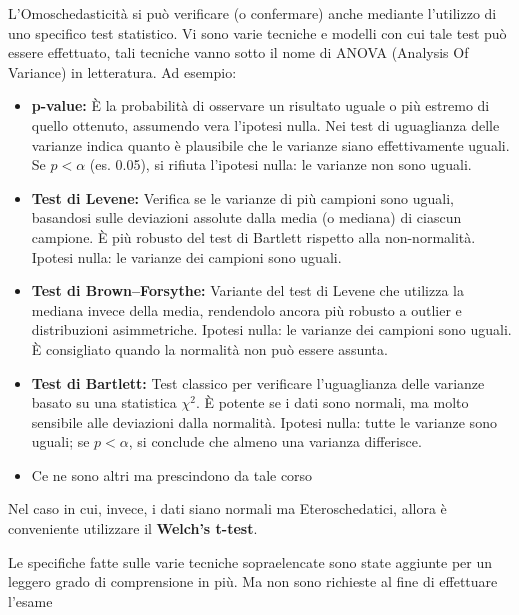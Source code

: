 L'Omoschedasticità si può verificare (o confermare) anche mediante l'utilizzo di uno specifico test statistico. Vi sono varie tecniche e modelli con cui tale test può essere effettuato, tali tecniche vanno sotto il nome di ANOVA (Analysis Of Variance) in letteratura. Ad esempio: 
\begin{itemize}

  \item \textbf{p-value:} 
  È la probabilità di osservare un risultato uguale o più estremo di quello ottenuto, assumendo vera l’ipotesi nulla. 
  Nei test di uguaglianza delle varianze indica quanto è plausibile che le varianze siano effettivamente uguali. 
  Se $p < \alpha$ (es. 0.05), si rifiuta l’ipotesi nulla: le varianze non sono uguali.

  \item \textbf{Test di Levene:} 
  Verifica se le varianze di più campioni sono uguali, basandosi sulle deviazioni assolute dalla media (o mediana) di ciascun campione. 
  È più robusto del test di Bartlett rispetto alla non-normalità. 
  Ipotesi nulla: le varianze dei campioni sono uguali.

  \item \textbf{Test di Brown–Forsythe:} 
  Variante del test di Levene che utilizza la mediana invece della media, rendendolo ancora più robusto a outlier e distribuzioni asimmetriche. 
  Ipotesi nulla: le varianze dei campioni sono uguali. 
  È consigliato quando la normalità non può essere assunta.

  \item \textbf{Test di Bartlett:} 
  Test classico per verificare l’uguaglianza delle varianze basato su una statistica $\chi^2$. 
  È potente se i dati sono normali, ma molto sensibile alle deviazioni dalla normalità. 
  Ipotesi nulla: tutte le varianze sono uguali; se $p < \alpha$, si conclude che almeno una varianza differisce.
    
  \item Ce ne sono altri ma prescindono da tale corso

\end{itemize}

Nel caso in cui, invece, i dati siano normali ma Eteroschedatici, allora è conveniente utilizzare il \textbf{Welch's t-test}. 

\begin{warn}
Le specifiche fatte sulle varie tecniche sopraelencate sono state aggiunte per un leggero grado di comprensione in più. Ma non sono richieste al fine di effettuare l'esame
\end{warn}

